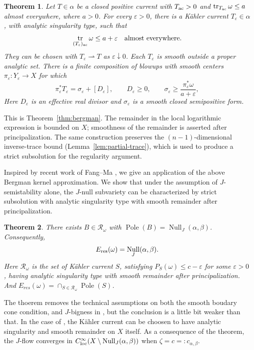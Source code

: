 \documentclass[reqno]{amsart}
\numberwithin{equation}{section}
\newtheorem{theorem}{Theorem}[section]
\theoremstyle{definition}
\DeclareMathOperator{\tr}{tr}
\DeclareMathOperator{\Null}{Null}
\DeclareMathOperator{\Pole}{Pole}
\newcommand{\cab}{c_{\alpha,\beta}}
\begin{document}
\begin{theorem}\label{thm:regularization}
Let $T\in\alpha$ be a closed positive current with
$T_{\rm ac}>0$ and $\tr_{T_{\rm ac}}\omega\le a$
almost everywhere, where $a>0$.
For every $\varepsilon>0$, there is a K\"ahler current $T_\varepsilon\in\alpha$,
with analytic singularity type, such that
\[
 \tr_{(T_\varepsilon)_{\rm ac}}\omega\le a+\varepsilon
 \quad\text{almost everywhere}.
\]
They can be chosen with $T_\varepsilon\rightharpoonup T$
as $\varepsilon\downarrow0$.
Each $T_\varepsilon$ is smooth outside a proper analytic set.
There is a finite composition of blowups with smooth centers
$\pi_\varepsilon:Y_\varepsilon\to X$ for which
\[
 \pi_\varepsilon^*T_\varepsilon
   =\sigma_\varepsilon+[D_\varepsilon],\qquad
 D_\varepsilon\ge0,\qquad
 \sigma_\varepsilon\ge
       \frac{\pi_\varepsilon^*\omega}{a+\varepsilon},
\]
Here $D_\varepsilon$ is an effective real divisor and
$\sigma_\varepsilon$ is a smooth closed semipositive form.
\end{theorem}

This is Theorem~\ref{thm:bergman}.
The remainder in the local logarithmic expression is bounded
on $X$; smoothness of the remainder is asserted after
principalization. The same construction preserves the
$(n-1)$-dimensional inverse-trace bound
(Lemma~\ref{lem:partial-trace}), which
is used to produce a strict subsolution for the regularity
argument.

Inspired by recent work of Fang--Ma \cite{FM26}, we give an application of the above Bergman kernel approximation. We show that under the assumption of $J$-semistability alone, the $J$-null subvariety can be characterized by strict subsolution with analytic singularity type with smooth remainder after principalization. \begin{theorem}
There exists $B\in\mathcal R_\omega$ with $\Pole(B)=\Null_J(\alpha,\beta)$.
Consequently,
\begin{equation}
 E_{\rm res}(\omega)=\Null_J(\alpha,\beta).
\end{equation}
Here $\mathcal{R}_\omega$ is the set of K\"ahler current $S$, satisfying $P_S(\omega)\le c-\varepsilon$ for some $\varepsilon>0$, having analytic singularity type with smooth remainder after principalization. And $E_{res}(\omega)=\cap_{S\in \mathcal{R}_\omega}\Pole(S)$.
\end{theorem}

The thoerem removes the technical assumptions on both the smooth boudary cone condition, and $J$-bigness in \cite{L26b}, but the conclusion is a little bit weaker than that. In the case of \cite{L26b}, the K\"ahler current can be choosen to have analytic singularity and smooth remainder on $X$ itself. As a consequence of the theorem, the $J$-flow converges in $C^\infty_{\rm loc}(X\setminus \Null_J(\alpha,\beta))$ when $\zeta=c=:\cab$.
\end{document}

